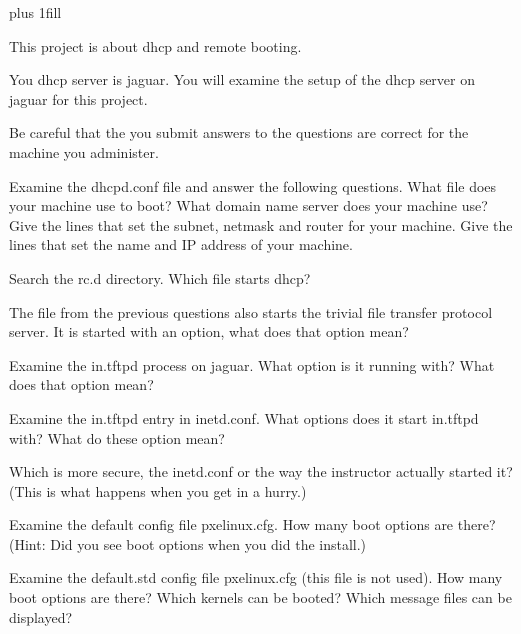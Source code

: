 
\rightskip=0pt plus 1fill

\parindent 0pt

This project is about dhcp and remote booting.

You dhcp server is jaguar.
You will examine the setup of the dhcp server on jaguar for this project.

Be careful that the you submit answers to the questions are correct
for the machine you administer.

Examine the {\ltt{}dhcpd.conf} file and answer the following questions.
What file does your machine use to boot?
What domain name server does your machine use?
Give the lines that set the subnet, netmask and router for
your machine.
Give the lines that set the name and IP address of your machine.

Search the {\ltt{}rc.d} directory. 
Which file starts {\ltt{}dhcp}?


The file from the previous questions also starts the trivial file
transfer protocol server.
It is started with an option, what does that option mean?

Examine the {\ltt{}in.tftpd} process on jaguar.
What option is it running with?
What does that option mean?

Examine the {\ltt{}in.tftpd} entry in {\ltt{}inetd.conf}.
What options does it start {\ltt{}in.tftpd} with?
What do these option mean?

Which is more secure, the {\ltt{}inetd.conf} or the way
the instructor actually started it?
(This is what happens when you get in a hurry.)

Examine the {\ltt{}default} config file {\ltt{}pxelinux.cfg}.
How many boot options are there?
(Hint: Did you see boot options when you did the install.)

Examine the {\ltt{}default.std} config file {\ltt{}pxelinux.cfg}
(this file is not used).
How many boot options are there?
Which kernels can be booted?
Which message files can be displayed?
\bye
